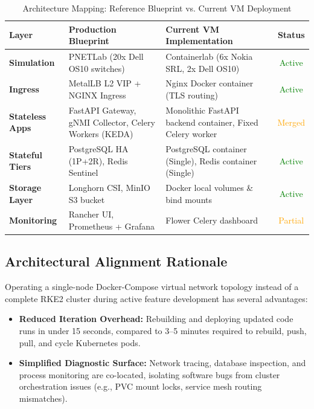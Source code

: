 \documentclass[11pt,a4paper]{article}
\begin{document}
\begin{table}[ht]
\centering
\caption{Architecture Mapping: Reference Blueprint vs. Current VM Deployment}
\vspace{0.2cm}
\begin{tabular}{p{3.5cm} p{5.5cm} p{5.5cm} c}
\toprule
\textbf{Layer} & \textbf{Production Blueprint} & \textbf{Current VM Implementation} & \textbf{Status} \\
\midrule
\textbf{Simulation} & PNETLab (20x Dell OS10 switches) & Containerlab (6x Nokia SRL, 2x Dell OS10) & \textcolor{green}{Active} \\
\textbf{Ingress} & MetalLB L2 VIP + NGINX Ingress & Nginx Docker container (TLS routing) & \textcolor{green}{Active} \\
\textbf{Stateless Apps} & FastAPI Gateway, gNMI Collector, Celery Workers (KEDA) & Monolithic FastAPI backend container, Fixed Celery worker & \textcolor{orange}{Merged} \\
\textbf{Stateful Tiers} & PostgreSQL HA (1P+2R), Redis Sentinel & PostgreSQL container (Single), Redis container (Single) & \textcolor{green}{Active} \\
\textbf{Storage Layer} & Longhorn CSI, MinIO S3 bucket & Docker local volumes \& bind mounts & \textcolor{green}{Active} \\
\textbf{Monitoring} & Rancher UI, Prometheus + Grafana & Flower Celery dashboard & \textcolor{orange}{Partial} \\
\bottomrule
\end{tabular}
\end{table}

\subsection{Architectural Alignment Rationale}
Operating a single-node Docker-Compose virtual network topology instead of a complete RKE2 cluster during active feature development has several advantages:
\begin{itemize}
    \item \textbf{Reduced Iteration Overhead:} Rebuilding and deploying updated code runs in under 15 seconds, compared to 3--5 minutes required to rebuild, push, pull, and cycle Kubernetes pods.
    \item \textbf{Simplified Diagnostic Surface:} Network tracing, database inspection, and process monitoring are co-located, isolating software bugs from cluster orchestration issues (e.g., PVC mount locks, service mesh routing mismatches).
\end{itemize}
\end{document}
